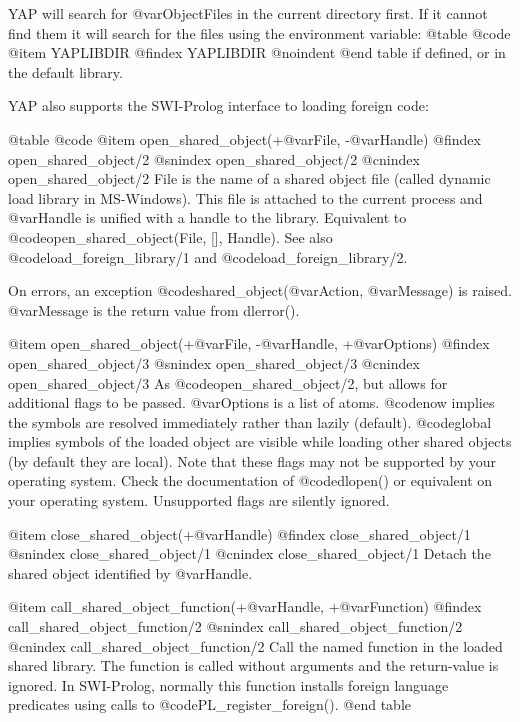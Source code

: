 YAP will search for @var{ObjectFiles} in the current directory first. If
it cannot find them it will search for the files using the environment
variable:
@table @code
@item YAPLIBDIR
@findex YAPLIBDIR
@noindent
@end table
if defined, or in the default library.

YAP also supports the SWI-Prolog interface to loading foreign code:

@table @code
@item open_shared_object(+@var{File}, -@var{Handle})
@findex open_shared_object/2
@snindex open_shared_object/2
@cnindex open_shared_object/2
    File is the name of a shared object file (called dynamic load
    library in MS-Windows). This file is attached to the current process
    and @var{Handle} is unified with a handle to the library. Equivalent to
    @code{open_shared_object(File, [], Handle)}. See also
    @code{load_foreign_library/1} and @code{load_foreign_library/2}.

    On errors, an exception @code{shared_object}(@var{Action},
    @var{Message}) is raised. @var{Message} is the return value from
    dlerror().

@item open_shared_object(+@var{File}, -@var{Handle}, +@var{Options})
@findex open_shared_object/3
@snindex open_shared_object/3
@cnindex open_shared_object/3
    As @code{open_shared_object/2}, but allows for additional flags to
    be passed. @var{Options} is a list of atoms. @code{now} implies the
    symbols are 
    resolved immediately rather than lazily (default). @code{global} implies
    symbols of the loaded object are visible while loading other shared
    objects (by default they are local). Note that these flags may not
    be supported by your operating system. Check the documentation of
    @code{dlopen()} or equivalent on your operating system. Unsupported
    flags  are silently ignored. 

@item close_shared_object(+@var{Handle})
@findex close_shared_object/1
@snindex close_shared_object/1
@cnindex close_shared_object/1
    Detach the shared object identified by @var{Handle}. 

@item call_shared_object_function(+@var{Handle}, +@var{Function})
@findex call_shared_object_function/2
@snindex call_shared_object_function/2
@cnindex call_shared_object_function/2
    Call the named function in the loaded shared library. The function
    is called without arguments and the return-value is
    ignored. In SWI-Prolog, normally this function installs foreign
    language predicates using calls to @code{PL_register_foreign()}.
@end table

